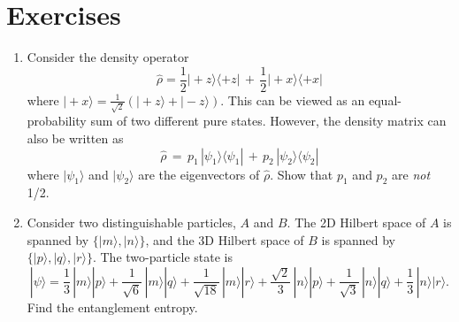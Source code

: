 \documentclass[pra,12pt]{revtex4}
\begin{document}
\section*{Exercises}

\begin{enumerate}

\item Consider the density operator
  \begin{equation}
    \hat{\rho} = \frac{1}{2} |\!+\!z\rangle \langle+z|
    \,+\, \frac{1}{2} |\!+\!x\rangle \langle+x|
  \end{equation}
  where $|\!+\!x\rangle = \frac{1}{\sqrt{2}} \left(|\!+\!z\rangle +
  |\!-\!z\rangle\right)$.  This can be viewed as an equal-probability
  sum of two different pure states.  However, the density matrix can
  also be written as
  \begin{equation}
    \hat{\rho} \,=\, p_1\, |\psi_1\rangle \langle \psi_1|
    \,+\, p_2\, |\psi_2\rangle \langle\psi_2|
  \end{equation}
  where $|\psi_{1}\rangle$ and $|\psi_{2}\rangle$ are the eigenvectors
  of $\hat{\rho}$.  Show that $p_1$ and $p_2$ are \textit{not} 1/2.
  \label{ex:rho_decomp}


\item 
  Consider two distinguishable particles, $A$ and $B$.  The 2D Hilbert
  space of $A$ is spanned by $\{|m\rangle, |n\rangle\}$, and the
  3D Hilbert space of $B$ is spanned by $\{|p\rangle, |q\rangle,
  |r\rangle\}$.  The two-particle state is
\begin{equation}
  |\psi\rangle = \frac{1}{3} \, |m\rangle|p\rangle
+ \frac{1}{\sqrt{6}} \, |m\rangle|q\rangle
+ \frac{1}{\sqrt{18}} \, |m\rangle|r\rangle
+ \frac{\sqrt{2}}{3} \, |n\rangle|p\rangle
+ \frac{1}{\sqrt{3}} \, |n\rangle|q\rangle
+ \frac{1}{3} \, |n\rangle|r\rangle.
\end{equation}
Find the entanglement entropy.

\end{enumerate}
\end{document}
